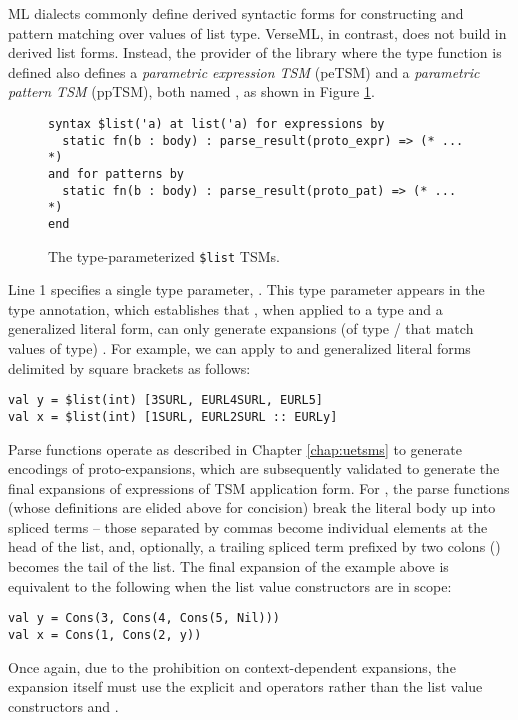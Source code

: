ML dialects commonly define derived syntactic forms for constructing and pattern matching over values of list type. VerseML, in contrast, does not build in derived list forms. Instead, the provider of the library where the type function  is defined also defines a \emph{parametric expression TSM} (peTSM) and a \emph{parametric pattern TSM} (ppTSM), both named , as shown in Figure \ref{fig:petsm-list}.
\begin{figure}[h]
\begin{lstlisting}[numbers=none]
syntax $list('a) at list('a) for expressions by 
  static fn(b : body) : parse_result(proto_expr) => (* ... *)
and for patterns by 
  static fn(b : body) : parse_result(proto_pat) => (* ... *) 
end
\end{lstlisting}
\caption{The type-parameterized \texttt{\$list} TSMs.}
\label{fig:petsm-list}
\end{figure}

Line 1 specifies a single type parameter, . This type parameter appears in the type annotation, which establishes that , when applied to a type  and a generalized literal form, can only generate expansions (of type / that match values of type) . For example, we can apply  to  and generalized literal forms delimited by square brackets as follows:
\begin{lstlisting}[numbers=none]
val y = $list(int) [3SURL, EURL4SURL, EURL5]
val x = $list(int) [1SURL, EURL2SURL :: EURLy]
\end{lstlisting}

Parse functions operate as described in Chapter \ref{chap:uetsms} to generate encodings of proto-expansions, which are subsequently validated to generate the final expansions of expressions of TSM application form. For , the parse functions (whose definitions are elided above for concision) break the literal body up into  spliced terms -- those separated by commas become individual elements at the head of the list, and, optionally, a trailing spliced term prefixed by two colons () becomes the tail of the list. The final expansion of the example above is equivalent to the following when the list value constructors are in scope:
\begin{lstlisting}[numbers=none]
val y = Cons(3, Cons(4, Cons(5, Nil)))
val x = Cons(1, Cons(2, y))
\end{lstlisting}
Once again, due to the prohibition on context-dependent expansions, the expansion itself must use the explicit  and  operators rather than the list value constructors  and .

